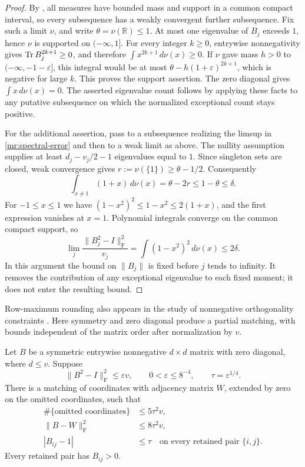 \begin{proof}
By , all measures have bounded mass and support in a common compact interval,
so every subsequence has a weakly convergent further subsequence.  Fix
such a limit $\nu$, and write $\theta=\nu(\mathbb R)\le1$.
At most one eigenvalue of $B_j$ exceeds $1$, hence $\nu$ is supported
on $(-\infty,1]$.  For every integer $k\ge0$, entrywise nonnegativity
gives $\operatorname{Tr} B_j^{2k+1}\ge0$, and therefore
$\int x^{2k+1}\,d\nu(x)\ge0$.  If $\nu$ gave mass $h>0$ to
$(-\infty,-1-\varepsilon]$, this integral would be at most
$\theta-h(1+\varepsilon)^{2k+1}$, which is negative for large $k$.
This proves the support assertion.  The zero diagonal gives
$\int x\,d\nu(x)=0$.  The asserted eigenvalue count follows by applying
these facts to any putative subsequence on which the normalized
exceptional count stays positive.

For the additional assertion, pass to a subsequence realizing the
limsup in \eqref{mr:spectral-error} and then to a weak limit as above.
The nullity assumption supplies at least $d_j-v_j/2-1$ eigenvalues
equal to $1$.  Since singleton sets are closed, weak convergence gives
$r:=\nu(\{1\})\ge\theta-1/2$.  Consequently
\[
 \int_{x\ne1}(1+x)\,d\nu(x)=\theta-2r
       \le1-\theta\le\delta.
\]
For $-1\le x\le1$ we have
$(1-x^2)^2\le1-x^2\le2(1+x)$, and the first expression vanishes at
$x=1$.  Polynomial integrals converge on the common compact support,
so
\[
 \lim_j\frac{\|B_j^2-I\|_{\mathrm F}^2}{v_j}
  =\int(1-x^2)^2\,d\nu(x)\le2\delta.
\]
In this argument the bound on $\|B_j\|$ is fixed before $j$ tends to
infinity.  It removes the contribution of any exceptional eigenvalue
to each fixed moment; it does not enter the resulting bound.
\end{proof}

Row-maximum rounding also appears in the study of nonnegative
orthogonality constraints \citep{JiangMengWenChen2023Nonnegative,ChenHeZhang2025Stiefel}.
Here symmetry and zero diagonal produce a partial matching, with
bounds independent of the matrix order after normalization by $v$.

\begin{lemma}\label{mr:matching}
Let $B$ be a symmetric entrywise nonnegative $d\times d$ matrix with
zero diagonal, where $d\le v$.  Suppose
\[
 \|B^2-I\|_{\mathrm F}^2\le\varepsilon v,
 \qquad 0<\varepsilon\le 8^{-4},
 \qquad \tau=\varepsilon^{1/4}.
\]
There is a matching of coordinates with adjacency matrix $W$, extended
by zero on the omitted coordinates, such that
\begin{align}
 \#\{\text{omitted coordinates}\}&\le5\tau^2v,
       \label{mr:matching-count}\\
 \|B-W\|_{\mathrm F}^2&\le8\tau^2v,
       \label{mr:matching-error}\\
 |B_{ij}-1|&\le\tau\quad\text{on every retained pair }\{i,j\}.
       \label{mr:matching-entry}
\end{align}
Every retained pair has $B_{ij}>0$.
\end{lemma}


